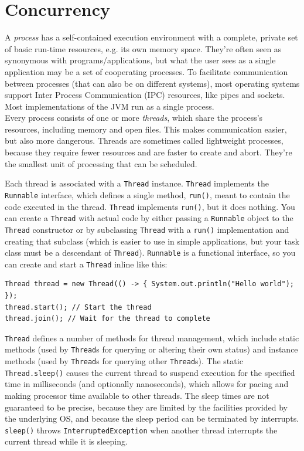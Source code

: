 \documentclass[table, xcdraw]{article}%
\begin{document}
\section{Concurrency} \label{concurrency}

A \emph{process} has a self-contained execution environment with a complete, private set of basic run-time resources, e.g. its own memory space. They're often seen as synonymous with programs/applications, but what the user sees as a single application may be a set of cooperating processes. To facilitate communication between processes (that can also be on different systems), most operating systems support Inter Process Communication (IPC) resources, like pipes and sockets. Most implementations of the JVM run as a single process.\\
Every process consists of one or more \emph{threads}, which share the process's resources, including memory and open files. This makes communication easier, but also more dangerous. Threads are sometimes called lightweight processes, because they require fewer resources and are faster to create and abort. They're the smallest unit of processing that can be scheduled.

Each thread is associated with a \texttt{Thread} instance. \texttt{Thread} implements the \texttt{Runnable} interface, which defines a single method, \texttt{run()}, meant to contain the code executed in the thread. \texttt{Thread} implements \texttt{run()}, but it does nothing. You can create a \texttt{Thread} with actual code by either passing a \texttt{Runnable} object to the \texttt{Thread} constructor or by subclassing \texttt{Thread} with a \texttt{run()} implementation and creating that subclass (which is easier to use in simple applications, but your task class must be a descendant of \texttt{Thread}). \texttt{Runnable} is a functional interface, so you can create and start a \texttt{Thread} inline like this:

\begin{verbatim}
Thread thread = new Thread(() -> { System.out.println("Hello world"); });
thread.start(); // Start the thread
thread.join(); // Wait for the thread to complete
\end{verbatim}

\texttt{Thread} defines a number of methods for thread management, which include static methods (used by \texttt{Thread}s for querying or altering their own status) and instance methods (used by \texttt{Thread}s for querying other \texttt{Thread}s). The static \texttt{Thread.sleep()} causes the current thread to suspend execution for the specified time in milliseconds (and optionally nanoseconds), which allows for pacing and making processor time available to other threads. The sleep times are not guaranteed to be precise, because they are limited by the facilities provided by the underlying OS, and because the sleep period can be terminated by interrupts. \texttt{sleep()} throws \texttt{InterruptedException} when another thread interrupts the current thread while it is sleeping.
\end{document}
